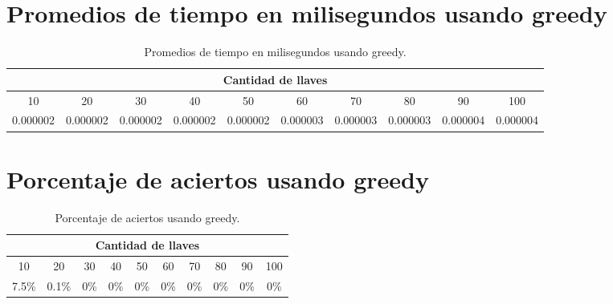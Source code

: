 \documentclass[a4paper]{article}
\begin{document}
\section{Promedios de tiempo en milisegundos usando greedy}

\begin{table}[H]
\centering
\relax
\resizebox{\textwidth}{!} {%
\begin{tabular}{|c|c|c|c|c|c|c|c|c|c|}
\hline
 \multicolumn{10}{|c|}{\textbf{Cantidad de llaves}} \\
 \hline 
10 & 20 & 30 & 40 & 50 & 60 & 70 & 80 & 90 & 100 \\
\hline
0.000002 & 0.000002 & 0.000002 & 0.000002 & 0.000002 & 0.000003 & 0.000003 & 0.000003 & 0.000004 & 0.000004 \\
\hline
\end{tabular}%
}
\caption{Promedios de tiempo en milisegundos usando greedy.}
\end{table}
\section{Porcentaje de aciertos usando greedy}

\begin{table}[H]
\centering
\relax
\resizebox{\textwidth}{!} {%
\begin{tabular}{|c|c|c|c|c|c|c|c|c|c|}
\hline
 \multicolumn{10}{|c|}{\textbf{Cantidad de llaves}} \\
 \hline 
10 & 20 & 30 & 40 & 50 & 60 & 70 & 80 & 90 & 100 \\
\hline
7.5\% & 0.1\% & 0\% & 0\% & 0\% & 0\% & 0\% & 0\% & 0\% & 0\% \\
\hline
\end{tabular}%
}
\caption{Porcentaje de aciertos usando greedy.}
\end{table}
\end{document}
